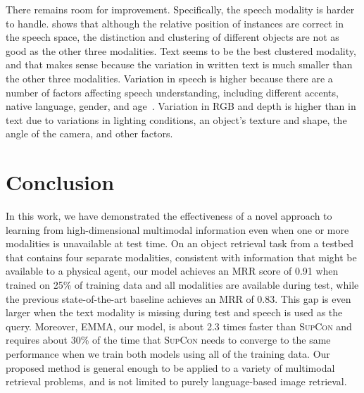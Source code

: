 \documentclass[sigconf,natbib=true,anonymous=true]{acmart}
\newcommand{\todokdinline}[1]{\todo[color=red!20,inline]{{KD: \small #1}}}
\newcommand{\ours}{\textsc{EMMA}}
\newcommand{\supcon}{\textsc{SupCon}}
\begin{document}
There remains room for improvement. Specifically, the speech modality is harder to handle.  shows that although the relative position of instances are correct in the speech space, the distinction and clustering of different objects are not as good as the other three modalities.
Text seems to be the best clustered modality, and that makes sense because the variation in written text is much smaller than the other three modalities. Variation in speech is higher because there are a number of factors affecting speech understanding, including different accents, native language, gender, and age~\citep{KebeAAAI2022}. Variation in RGB and depth is higher than in text due to variations in lighting conditions, an object's texture and shape, the angle of the camera, and other factors.




\section{Conclusion}
\label{sec:conclusion}


In this work, we have demonstrated the effectiveness of a novel approach to learning from high-dimensional multimodal information even when one or more modalities is unavailable at test time. On an object retrieval task from a testbed that contains four separate modalities, consistent with information that might be available to a physical agent, our model achieves an MRR score of 0.91 when trained on 25\% of training data and all modalities are available during test, while the previous state-of-the-art baseline achieves an MRR of 0.83. This gap is even larger when the text modality is missing during test and speech is used as the query.
Moreover, \ours{}, our model, is about 2.3 times faster than \supcon{} and requires about 30\% of the time that \supcon{} needs to converge to the same performance when we train both models using all of the training data.
Our proposed method is general enough to be applied to a variety of multimodal retrieval problems, and is not limited to purely language-based image retrieval.

\end{document}
